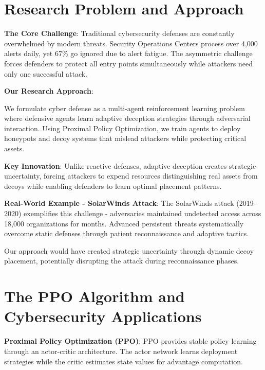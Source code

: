 \documentclass[11pt]{article}
\begin{document}
\section{Research Problem and Approach}

\begin{foundation}
\textbf{The Core Challenge}: Traditional cybersecurity defenses are constantly overwhelmed by modern threats. Security Operations Centers process over 4,000 alerts daily, yet 67\% go ignored due to alert fatigue. The asymmetric challenge forces defenders to protect all entry points simultaneously while attackers need only one successful attack.
\end{foundation}

\begin{research}
\textbf{Our Research Approach}:

We formulate cyber defense as a multi-agent reinforcement learning problem where defensive agents learn adaptive deception strategies through adversarial interaction. Using Proximal Policy Optimization, we train agents to deploy honeypots and decoy systems that mislead attackers while protecting critical assets.

\textbf{Key Innovation}: Unlike reactive defenses, adaptive deception creates strategic uncertainty, forcing attackers to expend resources distinguishing real assets from decoys while enabling defenders to learn optimal placement patterns.
\end{research}

\begin{example}
\textbf{Real-World Example - SolarWinds Attack}: The SolarWinds attack (2019-2020) exemplifies this challenge - adversaries maintained undetected access across 18,000 organizations for months. Advanced persistent threats systematically overcome static defenses through patient reconnaissance and adaptive tactics.

Our approach would have created strategic uncertainty through dynamic decoy placement, potentially disrupting the attack during reconnaissance phases.
\end{example}

\section{The PPO Algorithm and Cybersecurity Applications}

\begin{foundation}
\textbf{Proximal Policy Optimization (PPO)}: PPO provides stable policy learning through an actor-critic architecture. The actor network learns deployment strategies while the critic estimates state values for advantage computation.
\end{foundation}
\end{document}
